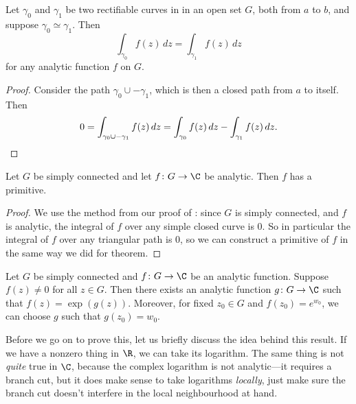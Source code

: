 


\begin{proposition}\label{prop4.6}
	Let $\gamma_0$ and $\gamma_1$ be two rectifiable curves in in an open set $G$, both from $a$ to $b$, and suppose $\gamma_0 \simeq \gamma_1$.
	Then
	\[
		\int_{\gamma_0} f(z) \, d z = \int_{\gamma_1} f(z) \, d z
	\]
	for any analytic function $f$ on $G$.
\end{proposition}

\begin{proof}
	Consider the path $\gamma_0 \cup - \gamma_1$, which is then a closed path from $a$ to itself.
	Then
	\[
		0 = \int_{\gamma_0 \cup - \gamma_1} f(z) \, d z = \int_{\gamma_0} f(z) \, d z - \int_{\gamma_1} f(z) \, d z. \qedhere
	\]
\end{proof}

\begin{corollary}\label{cor4.7}
	Let $G$ be simply connected and let $f \colon G \to \C$ be analytic.
	Then $f$ has a primitive.
\end{corollary}

\begin{proof}
	We use the method from our proof of : since $G$ is simply connected, and $f$ is analytic, the integral of $f$ over any simple closed curve is $0$.
	So in particular the integral of $f$ over any triangular path is $0$, so we can construct a primitive of $f$ in the same way we did for  theorem.
\end{proof}

\begin{corollary}\label{cor4.8}
	Let $G$ be simply connected and $f \colon G \to \C$ be an analytic function.
	Suppose $f(z) \neq 0$ for all $z \in G$.
	Then there exists an analytic function $g \colon G \to \C$ such that $f(z) = \exp(g(z))$.
	Moreover, for fixed $z_0 \in G$ and $f(z_0) = e^{w_0}$, we can choose $g$ such that $g(z_0) = w_0$.
\end{corollary}

Before we go on to prove this, let us briefly discuss the idea behind this result.
If we have a nonzero thing in $\R$, we can take its logarithm.
The same thing is not \emph{quite} true in $\C$, because the complex logarithm is not analytic---it requires a branch cut, but it does make sense to take logarithms \emph{locally}, just make sure the branch cut doesn't interfere in the local neighbourhood at hand.

